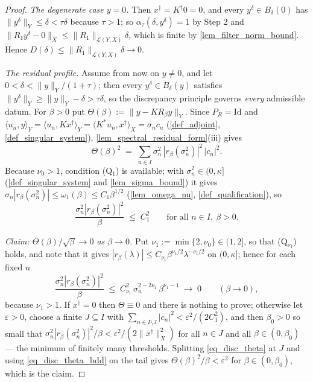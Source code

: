 \documentclass[a4paper]{report}
\theoremstyle{plain}
\theoremstyle{definition}
\theoremstyle{remark}
\newcommand{\Ll}{\mathcal{L}}
\newcommand{\Id}{\mathrm{Id}}
\newcommand{\dg}{^{\dagger}}
\begin{document}
\begin{proof}
  \emph{The degenerate case $y = 0$.}  Then $x\dg = K\dg 0 = 0$, and every
  $y^{\delta} \in B_{\delta}(0)$ has $\|y^{\delta}\|_Y \le \delta < \tau\delta$ because
  $\tau > 1$; so $\alpha_{\tau}(\delta,y^{\delta}) = 1$ by Step 2 and
  $\|R_1y^{\delta} - 0\|_X \le \|R_1\|_{\Ll(Y,X)}\delta$, which is finite by
  \cref{lem_filter_norm_bound}.  Hence $D(\delta) \le \|R_1\|_{\Ll(Y,X)}\delta \to 0$.

  \emph{The residual profile.}  Assume from now on $y \ne 0$, and let $0 < \delta <
  \|y\|_Y/(1+\tau)$; then every $y^{\delta} \in B_{\delta}(y)$ satisfies
  $\|y^{\delta}\|_Y \ge \|y\|_Y - \delta > \tau\delta$, so the discrepancy principle
  governs \emph{every} admissible datum.  For $\beta > 0$ put $\Theta(\beta) :=
  \|y - KR_{\beta}y\|_Y$.  Since $P_R = \Id$ and $\langle u_n,y\rangle_Y =
  \langle u_n, Kx\dg\rangle_Y = \langle K^{*}u_n, x\dg\rangle_X = \sigma_nc_n$
  (\cref{def_adjoint}, \cref{def_singular_system}), \cref{lem_spectral_residual_form}(iii)
  gives
  \begin{equation}\label{eq_disc_theta}
    \Theta(\beta)^{2} \;=\; \sum_{n \in I}\sigma_n^{2}\,
      |r_{\beta}(\sigma_n^{2})|^{2}\,|c_n|^{2} .
  \end{equation}
  Because $\nu_0 > 1$, condition (Q$_1$) is available; with $\sigma_n^{2} \in (0,\kappa]$
  (\cref{def_singular_system} and \cref{lem_sigma_bound}) it gives
  $\sigma_n|r_{\beta}(\sigma_n^{2})| \le \omega_1(\beta) \le C_1\beta^{1/2}$
  (\cref{lem_omega_nu}, \cref{def_qualification}), so
  \begin{equation}\label{eq_disc_theta_bdd}
    \frac{\sigma_n^{2}|r_{\beta}(\sigma_n^{2})|^{2}}{\beta} \;\le\; C_1^{2}
    \qquad\text{for all } n \in I,\ \beta > 0 .
  \end{equation}

  \emph{Claim: $\Theta(\beta)/\sqrt{\beta} \to 0$ as $\beta \to 0$.}  Put $\nu_1 :=
  \min\{2,\nu_0\} \in (1,2]$, so that (Q$_{\nu_1}$) holds, and note that it gives
  $|r_{\beta}(\lambda)| \le C_{\nu_1}\beta^{\nu_1/2}\lambda^{-\nu_1/2}$ on $(0,\kappa]$;
  hence for each fixed $n$
  \[
    \frac{\sigma_n^{2}|r_{\beta}(\sigma_n^{2})|^{2}}{\beta} \;\le\;
      C_{\nu_1}^{2}\,\sigma_n^{2-2\nu_1}\,\beta^{\nu_1-1}
    \;\longrightarrow\; 0 \qquad (\beta \to 0),
  \]
  because $\nu_1 > 1$.  If $x\dg = 0$ then $\Theta \equiv 0$ and there is nothing to
  prove; otherwise let $\varepsilon > 0$, choose a finite $J \subseteq I$ with
  $\sum_{n \in I \setminus J}|c_n|^{2} < \varepsilon^{2}/(2C_1^{2})$, and then
  $\beta_0 > 0$ so small that $\sigma_n^{2}|r_{\beta}(\sigma_n^{2})|^{2}/\beta <
  \varepsilon^{2}/(2\|x\dg\|_X^{2})$ for all $n \in J$ and all $\beta \in (0,\beta_0)$
  --- the minimum of finitely many thresholds.  Splitting \eqref{eq_disc_theta} at $J$
  and using \eqref{eq_disc_theta_bdd} on the tail gives $\Theta(\beta)^{2}/\beta <
  \varepsilon^{2}$ for $\beta \in (0,\beta_0)$, which is the claim.


\end{proof}
\end{document}
